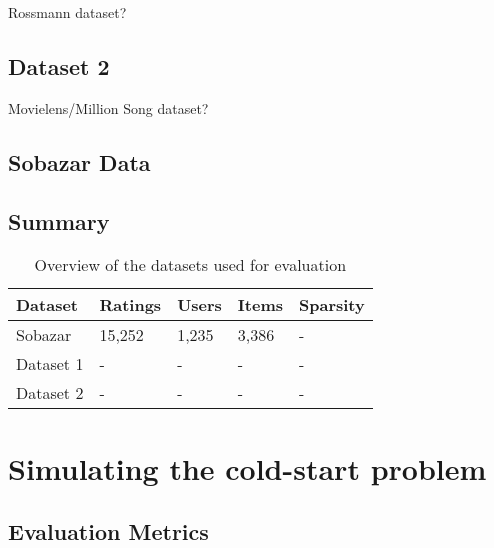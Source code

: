 Rossmann dataset?

\subsection{Dataset 2}

Movielens/Million Song dataset?

\subsection{Sobazar Data}



\subsection{Summary}



\begin{table}[H]
    \centering
    \begin{tabular}{|l|l|l|l|l|}
    \hline
	Dataset		& 	Ratings & 	Users	& 	Items 	& 	Sparsity 	\\ \hline
	Sobazar 	& 	15,252  & 	1,235	&	3,386	&	-			\\ \hline
	Dataset 1 	& 	-  		& 	-		&	-		&	-			\\ \hline
	Dataset 2 	& 	-  		& 	-		&	-		&	-			\\ \hline
    \end{tabular}
    \label{table:datasets}
    \caption [Overview of the datasets used for evaluation]{Overview of the datasets used for evaluation}
\end{table}


\section{Simulating the cold-start problem}



\subsection{Evaluation Metrics}